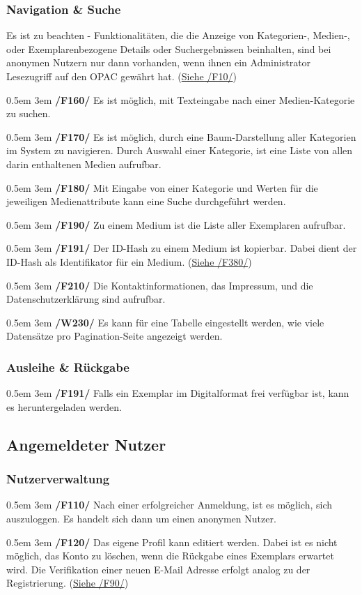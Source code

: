 \documentclass{article}
\newcommand{\specification}[3]{
	{\parindent 0.5em \hangindent 3em \hypertarget{spec:#1:#2}{\textbf{/#1#2/}} #3 \par \nobreak \vspace*{0.5em}}
}
\begin{document}
	\subsubsection{Navigation \& Suche}
		Es ist zu beachten - Funktionalitäten, die die Anzeige von Kategorien-, Medien-, oder Exemplarenbezogene Details oder Suchergebnissen beinhalten, sind bei anonymen Nutzern nur dann vorhanden,
		wenn ihnen ein Administrator Lesezugriff auf den OPAC gewährt hat. (\hyperlink{spec:F:10}{Siehe /F10/}) \par \vspace{0.5em}
		\specification{F}{160}{Es ist möglich, mit Texteingabe nach einer Medien-Kategorie zu suchen. }
		\specification{F}{170}{Es ist möglich, durch eine Baum-Darstellung aller Kategorien im System zu navigieren. Durch Auswahl einer Kategorie, ist eine Liste von allen darin enthaltenen Medien aufrufbar. }
		\specification{F}{180}{Mit Eingabe von einer Kategorie und Werten für die jeweiligen Medienattribute kann eine Suche durchgeführt werden. }
		\specification{F}{190}{Zu einem Medium ist die Liste aller Exemplaren aufrufbar. }
		\specification{F}{191}{Der ID-Hash zu einem Medium ist kopierbar. Dabei dient der ID-Hash als Identifikator für ein Medium. (\hyperlink{spec:F:380}{Siehe /F380/}) }
		\specification{F}{210}{Die Kontaktinformationen, das Impressum, und die Datenschutzerklärung sind aufrufbar. }
		\specification{W}{230}{Es kann für eine Tabelle eingestellt werden, wie viele Datensätze pro Pagination-Seite angezeigt werden. }
	\subsubsection{Ausleihe \& Rückgabe}
		\specification{F}{191}{Falls ein Exemplar im Digitalformat frei verfügbar ist, kann es heruntergeladen werden. }
\subsection{Angemeldeter Nutzer}
	\subsubsection{Nutzerverwaltung}
		\specification{F}{110}{Nach einer erfolgreicher Anmeldung, ist es möglich, sich auszuloggen. Es handelt sich dann um einen anonymen Nutzer. }
		\specification{F}{120}{Das eigene Profil kann editiert werden. Dabei ist es nicht möglich, das Konto zu löschen, wenn die Rückgabe eines Exemplars erwartet wird.
			Die Verifikation einer neuen E-Mail Adresse erfolgt analog zu der Registrierung. (\hyperlink{spec:F:90}{Siehe /F90/}) }
\end{document}
